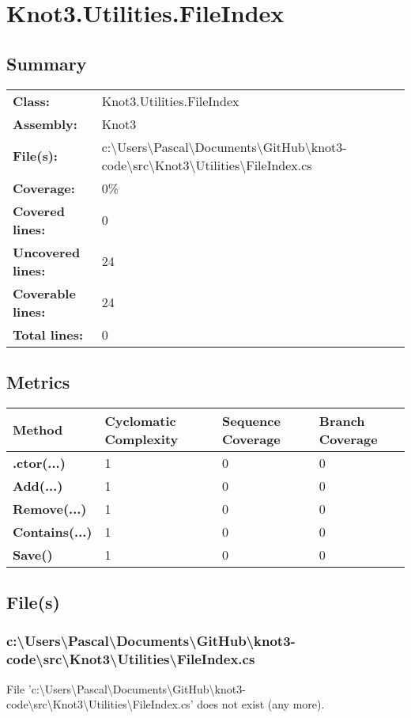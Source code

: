\documentclass[a4paper,10pt]{article}
\begin{document}
\section{Knot3.Utilities.FileIndex}
\subsection{Summary}
\begin{longtable}[l]{ll}
\textbf{Class:} & Knot3.Utilities.FileIndex\\
\textbf{Assembly:} & Knot3\\
\textbf{File(s):} & \begin{minipage}[t]{12cm}{c:\textbackslash Users\textbackslash Pascal\textbackslash Documents\textbackslash GitHub\textbackslash knot3-code\textbackslash src\textbackslash Knot3\textbackslash Utilities\textbackslash FileIndex.cs}\end{minipage} \\
\textbf{Coverage:} & 0\%\\
\textbf{Covered lines:} & 0\\
\textbf{Uncovered lines:} & 24\\
\textbf{Coverable lines:} & 24\\
\textbf{Total lines:} & 0\\
\end{longtable}
\subsection{Metrics}
\begin{longtable}[l]{|l|l|l|l|}
\hline
\textbf{Method} & \textbf{Cyclomatic Complexity} & \textbf{Sequence Coverage} & \textbf{Branch Coverage}\\
\hline
\textbf{.ctor(...)} & 1 & 0 & 0\\
\hline
\textbf{Add(...)} & 1 & 0 & 0\\
\hline
\textbf{Remove(...)} & 1 & 0 & 0\\
\hline
\textbf{Contains(...)} & 1 & 0 & 0\\
\hline
\textbf{Save()} & 1 & 0 & 0\\
\hline
\end{longtable}
\subsection{File(s)}
\subsubsection{c:\textbackslash Users\textbackslash Pascal\textbackslash Documents\textbackslash GitHub\textbackslash knot3-code\textbackslash src\textbackslash Knot3\textbackslash Utilities\textbackslash FileIndex.cs}
 File 'c:\textbackslash Users\textbackslash Pascal\textbackslash Documents\textbackslash GitHub\textbackslash knot3-code\textbackslash src\textbackslash Knot3\textbackslash Utilities\textbackslash FileIndex.cs' does not exist (any more).
\newpage
\end{document}
